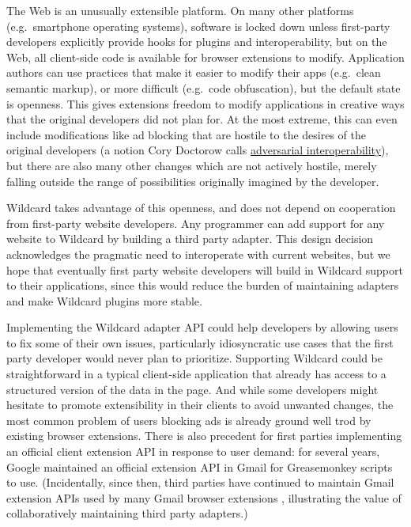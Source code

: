 \documentclass[english,submission]{programming}
\begin{document}
The Web is an unusually extensible platform. On many other platforms
(e.g.~smartphone operating systems), software is locked down unless
first-party developers explicitly provide hooks for plugins and
interoperability, but on the Web, all client-side code is available for
browser extensions to modify. Application authors can use practices that
make it easier to modify their apps (e.g.~clean semantic markup), or
more difficult (e.g.~code obfuscation), but the default state is
openness. This gives extensions freedom to modify applications in
creative ways that the original developers did not plan for. At the most
extreme, this can even include modifications like ad blocking that are
hostile to the desires of the original developers (a notion Cory
Doctorow calls
\href{https://www.eff.org/deeplinks/2019/10/adversarial-interoperability/}{adversarial
interoperability}), but there are also many other changes which are not
actively hostile, merely falling outside the range of possibilities
originally imagined by the developer.

Wildcard takes advantage of this openness, and does not depend on
cooperation from first-party website developers. Any programmer can add
support for any website to Wildcard by building a third party adapter.
This design decision acknowledges the pragmatic need to interoperate
with current websites, but we hope that eventually first party website
developers will build in Wildcard support to their applications, since
this would reduce the burden of maintaining adapters and make Wildcard
plugins more stable.

Implementing the Wildcard adapter API could help developers by allowing
users to fix some of their own issues, particularly idiosyncratic use
cases that the first party developer would never plan to prioritize.
Supporting Wildcard could be straightforward in a typical client-side
application that already has access to a structured version of the data
in the page. And while some developers might hesitate to promote
extensibility in their clients to avoid unwanted changes, the most
common problem of users blocking ads is already ground well trod by
existing browser extensions. There is also precedent for first parties
implementing an official client extension API in response to user
demand: for several years, Google maintained an official extension API
in Gmail for Greasemonkey scripts to use. (Incidentally, since then,
third parties have continued to maintain Gmail extension APIs used by
many Gmail browser extensions \autocite{streak,talwar2019}, illustrating
the value of collaboratively maintaining third party adapters.)
\end{document}
